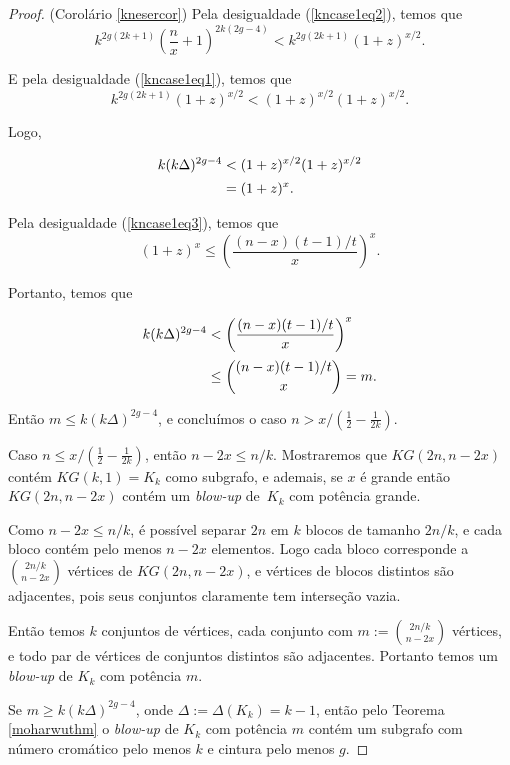 \begin{proof}{(Corolário \ref{knesercor})}
Pela desigualdade (\ref{kncase1eq2}), temos que \[k^{2g(2k+1)}\left(\frac{n}{x}+1\right)^{2k(2g-4)}< k^{2g(2k+1)}\left(1+z\right)^{x/2}.\]

E pela desigualdade (\ref{kncase1eq1}), temos que \[k^{2g(2k+1)}\left(1+z\right)^{x/2} < (1+z)^{x/2}(1+z)^{x/2}.\]

Logo,

\begin{equation*}
\setlength{\jot}{5pt}
\begin{aligned}
k(k\Delta)^{2g-4} & < (1+z)^{x/2}(1+z)^{x/2} \\
& = (1+z)^x.
\end{aligned}
\end{equation*}

Pela desigualdade (\ref{kncase1eq3}), temos que \[(1+z)^x \leq \left(\frac{(n-x)(t-1)/t}{x}\right)^x.\]

Portanto, temos que

\begin{equation*}
\setlength{\jot}{5pt}
\begin{aligned}
k(k\Delta)^{2g-4} & < \left(\frac{(n-x)(t-1)/t}{x}\right)^x \\
 & \leq \binom{(n-x)(t-1)/t}{x} = m.
\end{aligned}
\end{equation*}

Então $m \leq k(k\Delta)^{2g-4}$, e concluímos o caso $n > x/(\frac{1}{2} - \frac{1}{2k})$.

Caso $n \leq x/(\frac{1}{2} - \frac{1}{2k})$, então $n-2x \leq n/k$. Mostraremos que $KG(2n,n-2x)$ contém $KG(k,1) = K_k$ como subgrafo, e ademais, se $x$ é grande então $KG(2n,n-2x)$ contém um \textit{blow-up} de~$K_k$ com potência grande.

Como $n-2x \leq n/k$, é possível separar $2n$ em $k$ blocos de tamanho $2n/k$, e cada bloco contém pelo menos $n-2x$ elementos. Logo cada bloco corresponde a $\binom{2n/k}{n-2x}$ vértices de $KG(2n, n-2x)$, e vértices de blocos distintos são adjacentes, pois seus conjuntos claramente tem interseção vazia.

Então temos $k$ conjuntos de vértices, cada conjunto com $m := \binom{2n/k}{n-2x}$ vértices, e todo par de vértices de conjuntos distintos são adjacentes. Portanto temos um \textit{blow-up} de $K_k$ com potência $m$.

Se $m \geq k(k\Delta)^{2g-4}$, onde $\Delta := \Delta(K_k) = k-1$, então pelo Teorema \ref{moharwuthm} o \textit{blow-up} de $K_k$ com potência $m$ contém um subgrafo com número cromático pelo menos $k$ e cintura pelo menos $g$.


\end{proof}

